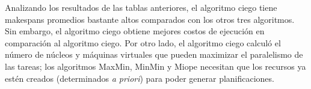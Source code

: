 Analizando los resultados de las tablas anteriores, el algoritmo ciego tiene makespans promedios bastante altos comparados con los otros tres algoritmos. Sin embargo, el algoritmo ciego obtiene mejores costos de ejecución en comparación al algoritmo ciego. Por otro lado, el algoritmo ciego calculó el número de núcleos y máquinas virtuales que pueden maximizar el paralelismo de las tareas; los algoritmos MaxMin, MinMin y Miope necesitan que los recursos ya estén creados (determinados \emph{a priori}) para poder generar planificaciones.

